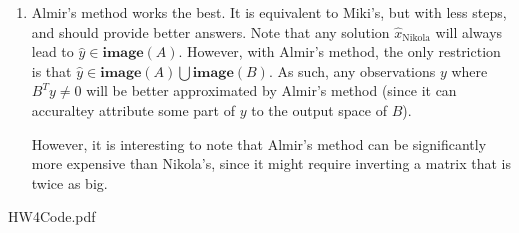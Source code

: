 \documentclass[12pt]{exam}
\begin{document}
\begin{questions}
\begin{solution}
\begin{enumerate}[label=(\alph*)]
      \item Almir's method works the best. It is equivalent to Miki's, but with less steps, and should provide better answers. Note that any solution $\hat{x}_{\text{Nikola}}$ will always lead to $\hat{y} \in \textbf{image}(A)$. However, with Almir's method, the only restriction is that $\hat{y} \in \textbf{image}(A) \bigcup \textbf{image}(B)$. As such, any observations $y$ where $B^Ty \neq 0$ will be better approximated by Almir's method (since it can accuraltey attribute some part of $y$ to the output space of $B$).

      However, it is interesting to note that Almir's method can be significantly more expensive than Nikola's, since it might require inverting a matrix that is twice as big.
    \end{enumerate}

  \end{solution}

\end{questions}


{HW4Code.pdf}
\end{document}
